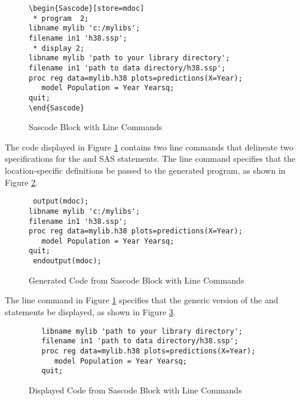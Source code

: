 \documentclass[article,oneside]{memoir}
\begin{document}
\begin{figure}[H]
\begin{snugshade}
\begin{verbatim}
\begin{Sascode}[store=mdoc]
 * program  2;
libname mylib 'c:/mylibs';
filename in1 'h38.ssp';
 * display 2;
libname mylib 'path to your library directory';
filename in1 'path to data directory/h38.ssp';
proc reg data=mylib.h38 plots=predictions(X=Year);
   model Population = Year Yearsq;
quit;
\end{Sascode}
\end{verbatim}
\end{snugshade}
\caption{Sascode Block with Line Commands}\label{sblc}
\end{figure}
  The code displayed in Figure \ref{sblc} contains
  two line commands that delineate two
  specifications for the  and  SAS statements.
  The line command  specifies that the location-specific
  definitions be passed to the generated program,
   as shown in Figure \ref{fig:gsblc}.
\begin{figure}[H]
\begin{snugshade}
\begin{verbatim}
 output(mdoc);
libname mylib 'c:/mylibs';
filename in1 'h38.ssp';
proc reg data=mylib.h38 plots=predictions(X=Year);
   model Population = Year Yearsq;
quit;
 endoutput(mdoc);
\end{verbatim}
\end{snugshade}
\caption{Generated Code from Sascode Block with Line Commands}\label{fig:gsblc}
\end{figure}

  The line command  in Figure \ref{sblc}
  specifies that the generic version
  of the  and  statements be displayed,
  as shown in Figure \ref{dsblc}.
\begin{figure}[H]
\begin{snugshade}
\begin{verbatim}
   libname mylib 'path to your library directory';
   filename in1 'path to data directory/h38.ssp';
   proc reg data=mylib.h38 plots=predictions(X=Year);
      model Population = Year Yearsq;
   quit;
\end{verbatim}
\end{snugshade}
\caption{Displayed Code from Sascode Block with Line Commands}\label{dsblc}
\end{figure}
\end{document}

